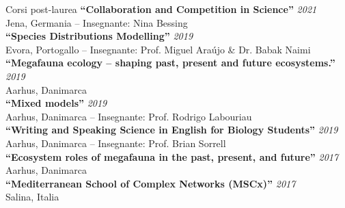 \documentclass{resume} %
\begin{document}

\begin{rSection}{Corsi post-laurea}
{\bf ``Collaboration and Competition in Science''} \hfill {\em 2021}\\
Jena, Germania -- Insegnante: Nina Bessing\\
{\bf ``Species Distributions Modelling''} \hfill {\em 2019}\\
Evora, Portogallo -- Insegnante: Prof. Miguel Ara\'{u}jo \& Dr. Babak Naimi\\
{\bf ``Megafauna ecology -- shaping past, present and future ecosystems.''} \hfill {\em 2019}\\
Aarhus, Danimarca\\
{\bf ``Mixed models''} \hfill {\em 2019}\\
Aarhus, Danimarca -- Insegnante: Prof. Rodrigo Labouriau\\
{\bf ``Writing and Speaking Science in English for Biology Students''} \hfill {\em 2019} \\
Aarhus, Danimarca -- Insegnante: Prof. Brian Sorrell \\
{\bf ``Ecosystem roles of megafauna in the past, present, and future''} \hfill {\em 2017}\\
Aarhus, Danimarca\\
{\bf ``Mediterranean School of Complex Networks (MSCx)''} \hfill {\em 2017} \\
Salina, Italia
\end{rSection}
\end{document}
